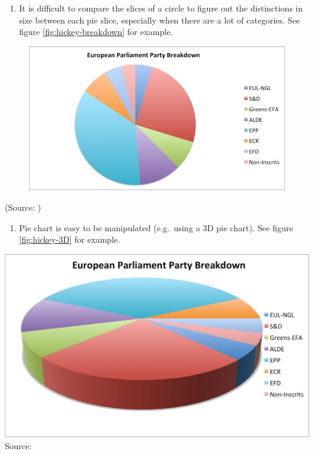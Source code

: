\documentclass[]{book}
\providecommand{\tightlist}{%
  \setlength{\itemsep}{0pt}\setlength{\parskip}{0pt}}
\theoremstyle{definition}
\theoremstyle{definition}
\theoremstyle{definition}
\theoremstyle{remark}
\begin{document}
\begin{enumerate}
\def\labelenumi{\arabic{enumi}.}
\setcounter{enumi}{1}
\tightlist
\item
  It is difficult to compare the slices of a circle to figure out the
  distinctions in size between each pie slice, especially when there are
  a lot of categories. See figure \ref{fig:hickey-breakdown} for
  example.
\end{enumerate}

\begin{figure}
\centering
\includegraphics{images/hickey-breakdown.jpg}
\caption{}
\end{figure}

(Source: \citep{hickey-pie-worst})

\begin{enumerate}
\def\labelenumi{\arabic{enumi}.}
\setcounter{enumi}{2}
\tightlist
\item
  Pie chart is easy to be manipulated (e.g.~using a 3D pie chart). See
  figure \ref{fig:hickey-3D} for example.
\end{enumerate}

\includegraphics{images/hickey-3D.jpg} Source: \citep{hickey-pie-worst}
\end{document}
